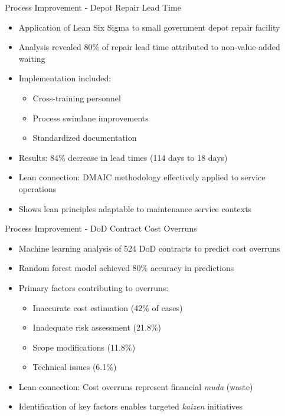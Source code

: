 \documentclass[aspectratio=169,11pt,xcolor={dvipsnames},hyperref={pdftex,pdfpagemode=UseNone,hidelinks,pdfdisplaydoctitle=true},usepdftitle=false]{beamer}
\begin{document}
    \begin{frame}{Process Improvement - Depot Repair Lead Time \cite{Richmond2023}}
      \begin{itemize}
        \item Application of Lean Six Sigma to small government depot repair facility
        \item Analysis revealed 80\% of repair lead time attributed to non-value-added waiting
        \item Implementation included:
          \begin{itemize}
            \item Cross-training personnel
            \item Process swimlane improvements
            \item Standardized documentation
          \end{itemize}
        \item Results: 84\% decrease in lead times (114 days to 18 days)
        \item Lean connection: DMAIC methodology effectively applied to service operations
        \item Shows lean principles adaptable to maintenance service contexts
      \end{itemize}
    \end{frame}

    \begin{frame}{Process Improvement - DoD Contract Cost Overruns \cite{FunchesAllen2025}}
      \begin{itemize}
        \item Machine learning analysis of 524 DoD contracts to predict cost overruns
        \item Random forest model achieved 80\% accuracy in predictions
        \item Primary factors contributing to overruns:
          \begin{itemize}
            \item Inaccurate cost estimation (42\% of cases)
            \item Inadequate risk assessment (21.8\%)
            \item Scope modifications (11.8\%)
            \item Technical issues (6.1\%)
          \end{itemize}
        \item Lean connection: Cost overruns represent financial \textit{muda} (waste)
        \item Identification of key factors enables targeted \textit{kaizen} initiatives
      \end{itemize}
    \end{frame}
\end{document}
